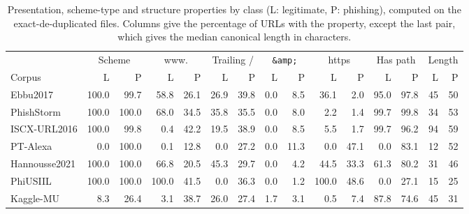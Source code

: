 \begin{table}[tp]
\centering
\caption{Presentation, scheme-type and structure properties by class (L: legitimate, P: phishing), computed on the exact-de-duplicated files. Columns give the percentage of URLs with the property, except the last pair, which gives the median canonical length in characters.}
\label{tab:artefacts}
\footnotesize
\setlength{\tabcolsep}{3pt}
\begin{adjustbox}{max width=\linewidth}
\begin{tabular}{@{}l*{14}{r}@{}}
\toprule
 & \multicolumn{2}{c}{Scheme} & \multicolumn{2}{c}{www.} & \multicolumn{2}{c}{Trailing /} & \multicolumn{2}{c}{\texttt{\&amp;}} & \multicolumn{2}{c}{https} & \multicolumn{2}{c}{Has path} & \multicolumn{2}{c}{Length} \\
\cmidrule(lr){2-3}\cmidrule(lr){4-5}\cmidrule(lr){6-7}\cmidrule(lr){8-9}\cmidrule(lr){10-11}\cmidrule(lr){12-13}\cmidrule(lr){14-15}
Corpus & L & P & L & P & L & P & L & P & L & P & L & P & L & P \\
\midrule
Ebbu2017 & 100.0 & 99.7 & 58.8 & 26.1 & 26.9 & 39.8 & 0.0 & 8.5 & 36.1 & 2.0 & 95.0 & 97.8 & 45 & 50 \\
PhishStorm & 100.0 & 100.0 & 68.0 & 34.5 & 35.8 & 35.5 & 0.0 & 8.0 & 2.2 & 1.4 & 99.7 & 99.8 & 34 & 53 \\
ISCX-URL2016 & 100.0 & 99.8 & 0.4 & 42.2 & 19.5 & 38.9 & 0.0 & 8.5 & 5.5 & 1.7 & 99.7 & 96.2 & 94 & 59 \\
PT-Alexa & 0.0 & 100.0 & 0.1 & 12.8 & 0.0 & 27.2 & 0.0 & 11.3 & 0.0 & 47.1 & 0.0 & 83.1 & 12 & 52 \\
Hannousse2021 & 100.0 & 100.0 & 66.8 & 20.5 & 45.3 & 29.7 & 0.0 & 4.2 & 44.5 & 33.3 & 61.3 & 80.2 & 31 & 46 \\
PhiUSIIL & 100.0 & 100.0 & 100.0 & 41.5 & 0.0 & 36.3 & 0.0 & 1.2 & 100.0 & 48.6 & 0.0 & 27.1 & 15 & 25 \\
Kaggle-MU & 8.3 & 26.4 & 3.1 & 38.7 & 26.0 & 27.4 & 1.7 & 3.1 & 0.5 & 7.4 & 87.8 & 74.6 & 45 & 31 \\
\bottomrule
\end{tabular}
\end{adjustbox}
\end{table}
